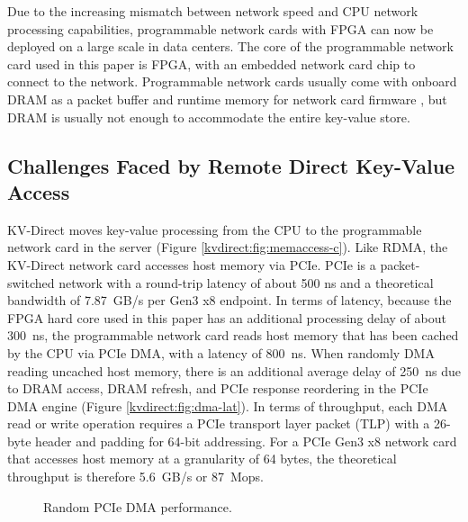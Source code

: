 Due to the increasing mismatch between network speed and CPU network processing capabilities, programmable network cards with FPGA \cite {vfp,greenberg2015sdn,li2016clicknp,caulfield2016cloud} can now be deployed on a large scale in data centers. The core of the programmable network card used in this paper is FPGA, with an embedded network card chip to connect to the network. Programmable network cards usually come with onboard DRAM as a packet buffer and runtime memory for network card firmware \cite {li2016clicknp}, but DRAM is usually not enough to accommodate the entire key-value store.
\fi

\subsection{Challenges Faced by Remote Direct Key-Value Access}
\label{kvdirect:sec:challenge}

KV-Direct moves key-value processing from the CPU to the programmable network card in the server (Figure \ref {kvdirect:fig:memaccess-c}). Like RDMA, the KV-Direct network card accesses host memory via PCIe. PCIe is a packet-switched network with a round-trip latency of about 500 ns and a theoretical bandwidth of 7.87~GB/s per Gen3 x8 endpoint. In terms of latency, because the FPGA hard core used in this paper has an additional processing delay of about 300~ns, the programmable network card reads host memory that has been cached by the CPU via PCIe DMA, with a latency of 800~ns. When randomly DMA reading uncached host memory, there is an additional average delay of 250~ns due to DRAM access, DRAM refresh, and PCIe response reordering in the PCIe DMA engine (Figure \ref {kvdirect:fig:dma-lat}). In terms of throughput, each DMA read or write operation requires a PCIe transport layer packet (TLP) with a 26-byte header and padding for 64-bit addressing. For a PCIe Gen3 x8 network card that accesses host memory at a granularity of 64 bytes, the theoretical throughput is therefore 5.6~GB/s or 87~Mops.

\begin{figure}[t]
	\centering
	\caption{Random PCIe DMA performance.}
	\label{kvdirect:fig:dma-perf}
\end{figure}

